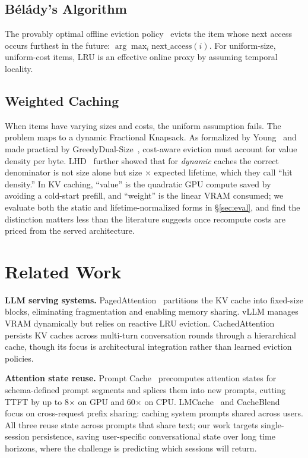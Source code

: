 \documentclass[letterpaper,twocolumn,10pt]{article}
\begin{document}
\subsection{B\'{e}l\'{a}dy's Algorithm}
The provably optimal offline eviction policy~\cite{belady1966replacement} evicts the item whose next access occurs furthest in the future: $\arg\max_{i} \text{next\_access}(i)$. For uniform-size, uniform-cost items, LRU is an effective online proxy by assuming temporal locality.

\subsection{Weighted Caching}
When items have varying sizes and costs, the uniform assumption fails. The problem maps to a dynamic Fractional Knapsack. As formalized by Young~\cite{young1994caching} and made practical by GreedyDual-Size~\cite{cao1997greedydualsize}, cost-aware eviction must account for value density per byte. LHD~\cite{beckmann2018lhd} further showed that for \emph{dynamic} caches the correct denominator is not size alone but size $\times$ expected lifetime, which they call ``hit density.'' In KV caching, ``value'' is the quadratic GPU compute saved by avoiding a cold-start prefill, and ``weight'' is the linear VRAM consumed; we evaluate both the static and lifetime-normalized forms in \S\ref{sec:eval}, and find the distinction matters less than the literature suggests once recompute costs are priced from the served architecture.

\section{Related Work}

\textbf{LLM serving systems.} PagedAttention~\cite{kwon2023pagedattention} partitions the KV cache into fixed-size blocks, eliminating fragmentation and enabling memory sharing. vLLM manages VRAM dynamically but relies on reactive LRU eviction. CachedAttention~\cite{gao2024cachedattention} persists KV caches across multi-turn conversation rounds through a hierarchical cache, though its focus is architectural integration rather than learned eviction policies.

\textbf{Attention state reuse.} Prompt Cache~\cite{gim2024promptcache} precomputes attention states for schema-defined prompt segments and splices them into new prompts, cutting TTFT by up to 8$\times$ on GPU and 60$\times$ on CPU. LMCache~\cite{zhong2024lmcache} and CacheBlend~\cite{yao2024cacheblend} focus on cross-request prefix sharing: caching system prompts shared across users. All three reuse state across prompts that share text; our work targets single-session persistence, saving user-specific conversational state over long time horizons, where the challenge is predicting which sessions will return.
\end{document}
